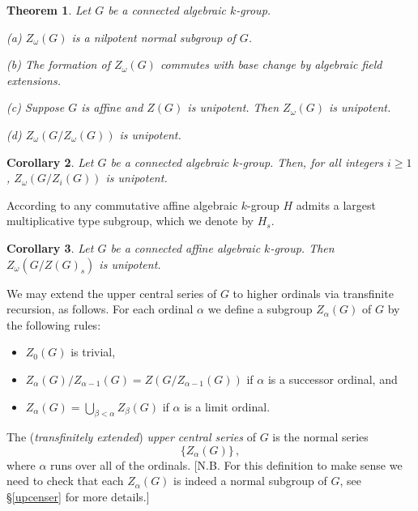 \documentclass[twoside,a4paper,reqno,11pt]{amsart}
\newtheorem{theorem}{Theorem}[section]
\newtheorem{corollary}[theorem]{Corollary}
\theoremstyle{definition}
\begin{document}
\begin{theorem}\label{hypercenterthm} Let $G$ be a connected algebraic $k$-group.

\vspace{1mm}\noindent (a) $Z_\omega(G)$ is a nilpotent normal subgroup of $G$.

\vspace{1mm}\noindent (b) The formation of $Z_\omega(G)$ commutes with base change by algebraic field extensions.

\vspace{1mm}\noindent (c) Suppose $G$ is affine and $Z(G)$ is unipotent. Then $Z_\omega(G)$ is unipotent.

\vspace{1mm}\noindent (d) $Z_{\omega}(G/Z_\omega(G))$ is unipotent. %
\end{theorem}

\begin{corollary}\label{hypercentercor1} Let $G$ be a connected algebraic $k$-group. Then, for all integers $i\geq 1$, $Z_{\omega}(G/Z_i(G))$ is unipotent.
\end{corollary}

\noindent According to \cite[IV, \S 3, Thm.\ 1.1(a)]{DG} any commutative affine algebraic $k$-group $H$ admits a largest multiplicative type subgroup, which we denote by $H_s$.

\begin{corollary}\label{hypercentercor2} Let $G$ be a connected affine algebraic $k$-group. Then $Z_{\omega}(G/Z(G)_s)$ is unipotent.
\end{corollary}

\noindent We may extend the upper central series of $G$ to higher ordinals via transfinite recursion, as follows. For each ordinal $\alpha$ we define a subgroup $Z_\alpha(G)$ of $G$ by the following rules: \begin{itemize}\item $Z_0(G)$ is trivial, \vspace{1mm}\item $Z_{\alpha}(G)/Z_{\alpha-1}(G)=Z(G/Z_{\alpha-1}(G))$ if $\alpha$ is a successor ordinal, and \vspace{0.8mm}\item $Z_\alpha(G)=\bigcup_{\beta<\alpha}Z_\beta(G)$ if $\alpha$ is a limit ordinal.\end{itemize} The (\textit{transfinitely extended}) \textit{upper central series} of $G$ is the normal series \begin{equation}\label{transuppercentserorig} \{Z_\alpha(G)\}\,,\end{equation} where $\alpha$ runs over all of the ordinals. [N.B. For this definition to make sense we need to check that each $Z_\alpha(G)$ is indeed a normal subgroup of $G$, see \S \ref{upcenser} for more details.]
\end{document}
